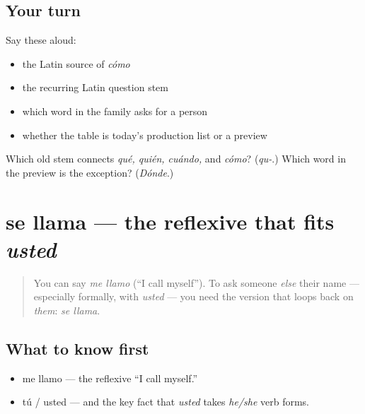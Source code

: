 \subsection*{Your turn}
Say these aloud:

\begin{itemize}
\raggedright
  \item the Latin source of \emph{cómo}
  \item the recurring Latin question stem
  \item which word in the family asks for a person
  \item whether the table is today's production list or a preview
\end{itemize}

\begin{tcolorbox}[breakable,colback=teal!4,colframe=teal!35!black,title={Before you move on}]
Which old stem connects \emph{qué, quién, cuándo,} and \emph{cómo}? (\emph{qu-}.) Which word in the preview is the exception? (\emph{Dónde}.)
\end{tcolorbox}
\section[se llama]{se llama — the reflexive that fits \emph{usted}}

\label{lesson:ES-C03-se-llama}



\begin{quote}
You can say \emph{me llamo} (\textquotedblleft{}I call myself\textquotedblright{}). To ask someone \emph{else} their name — especially formally, with \emph{usted} — you need the version that loops back on \emph{them}: \emph{se llama}.
\end{quote}

\subsection*{What to know first}
\begin{itemize}
\raggedright
  \item me llamo — the reflexive \textquotedblleft{}I call myself.\textquotedblright{}
  \item tú / usted — and the key fact that \emph{usted} takes \emph{he/she} verb forms.
\end{itemize}

